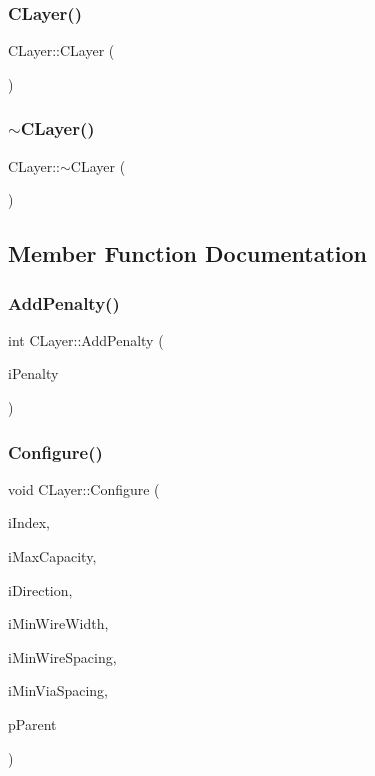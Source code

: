 \subsubsection{\texorpdfstring{CLayer()}{CLayer()}}
{\footnotesize\ttfamily C\+Layer\+::\+C\+Layer (\begin{DoxyParamCaption}{ }\end{DoxyParamCaption})}

\mbox{\label{classCLayer_a78d56eb9fffa4188383cdc0ca91ee67c}} 
\subsubsection{\texorpdfstring{$\sim$CLayer()}{~CLayer()}}
{\footnotesize\ttfamily C\+Layer\+::$\sim$\+C\+Layer (\begin{DoxyParamCaption}{ }\end{DoxyParamCaption})\hspace{0.3cm}{\ttfamily [virtual]}}



\subsection{Member Function Documentation}
\mbox{\label{classCLayer_a47bb48736ac93a95148807e67ec279f1}} 
\subsubsection{\texorpdfstring{AddPenalty()}{AddPenalty()}}
{\footnotesize\ttfamily int C\+Layer\+::\+Add\+Penalty (\begin{DoxyParamCaption}\item[{int}]{i\+Penalty }\end{DoxyParamCaption})}

\mbox{\label{classCLayer_a3d0413e4f025d57639ae6bbd6d34955f}} 
\subsubsection{\texorpdfstring{Configure()}{Configure()}}
{\footnotesize\ttfamily void C\+Layer\+::\+Configure (\begin{DoxyParamCaption}\item[{int}]{i\+Index,  }\item[{int}]{i\+Max\+Capacity,  }\item[{int}]{i\+Direction,  }\item[{int}]{i\+Min\+Wire\+Width,  }\item[{int}]{i\+Min\+Wire\+Spacing,  }\item[{int}]{i\+Min\+Via\+Spacing,  }\item[{\mbox{\hyperlink{classCDesign}{C\+Design}} $\ast$}]{p\+Parent }\end{DoxyParamCaption})}

